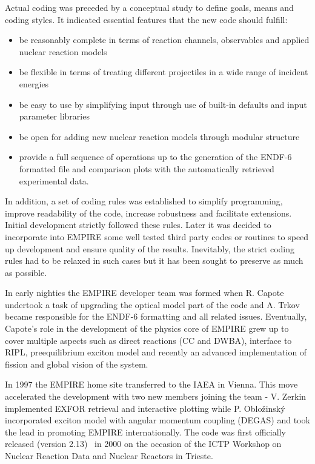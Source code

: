 Actual coding was preceded by a conceptual study to define goals, means and
coding styles. It indicated essential features that the new code should
fulfill:

\begin{itemize}
\item be reasonably complete in terms of reaction channels, observables and
applied nuclear reaction models

\item be flexible in terms of treating different projectiles in a wide range
of incident energies

\item be easy to use by simplifying input through use of built-in defaults
and input parameter libraries

\item be open for adding new nuclear reaction models through modular
structure

\item provide a full sequence of operations up to the generation of the
ENDF-6 formatted file and comparison plots with the automatically retrieved
experimental data.
\end{itemize}

In addition, a set of coding rules was established to simplify programming,
improve readability of the code, increase robustness and facilitate
extensions. Initial development strictly followed these rules. Later it was
decided to incorporate into EMPIRE some well tested third party codes or
routines to speed up development and ensure quality of the results.
Inevitably, the strict coding rules had to be relaxed in such cases but it
has been sought to preserve as much as possible.

In early nighties the EMPIRE developer team was formed when R. Capote
undertook a task of upgrading the optical model part of the code and A.
Trkov became responsible for the ENDF-6 formatting and all related issues.
Eventually, Capote's role in the development of the physics core of EMPIRE
grew up to cover multiple aspects such as direct reactions (CC and DWBA),
interface to RIPL, preequilibrium exciton model and recently an advanced
implementation of fission and global vision of the system.

In 1997 the EMPIRE home site transferred to the IAEA in Vienna. This move
accelerated the development with two new members joining the team - V.
Zerkin implemented EXFOR retrieval and interactive plotting while P. Oblo\v
zinsk\'y incorporated exciton model with angular momentum coupling (DEGAS)
and took the lead in promoting EMPIRE internationally. The code was first
officially released (version 2.13)~\cite{EMPIRE:Trieste01} in 2000 on the
occasion of the ICTP Workshop on Nuclear Reaction Data and Nuclear Reactors
in Trieste.


